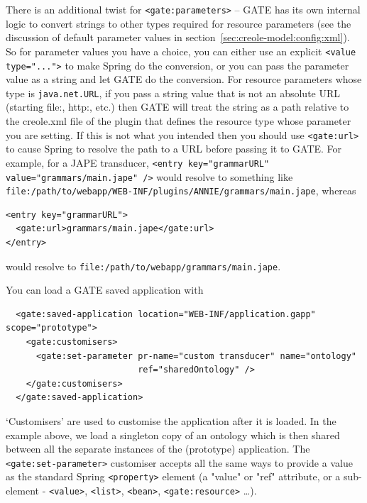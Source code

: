 There is an additional twist for \verb|<gate:parameters>| -- GATE has its own
internal logic to convert strings to other types required for resource
parameters (see the discussion of default parameter values in
section~\ref{sec:creole-model:config:xml}).  So for parameter values you have a
choice, you can either use an explicit \verb|<value type="...">| to make Spring
do the conversion, or you can pass the parameter value as a string and let GATE
do the conversion.  For resource parameters whose type is \verb|java.net.URL|,
if you pass a string value that is not an absolute URL (starting file:, http:,
etc.) then GATE will treat the string as a path relative to the creole.xml file
of the plugin that defines the resource type whose parameter you are setting.
If this is not what you intended then you should use \verb|<gate:url>| to cause
Spring to resolve the path to a URL before passing it to GATE.  For example,
for a JAPE transducer,
\verb|<entry key="grammarURL" value="grammars/main.jape" />| would resolve to
something like
\verb|file:/path/to/webapp/WEB-INF/plugins/ANNIE/grammars/main.jape|, whereas
%
\begin{small}\begin{verbatim}
<entry key="grammarURL">
  <gate:url>grammars/main.jape</gate:url>
</entry>
\end{verbatim}\end{small}
would resolve to \verb|file:/path/to/webapp/grammars/main.jape|.

You can load a GATE saved application with
\begin{small}
\begin{verbatim}
  <gate:saved-application location="WEB-INF/application.gapp" scope="prototype">
    <gate:customisers>
      <gate:set-parameter pr-name="custom transducer" name="ontology"
                          ref="sharedOntology" />
    </gate:customisers>
  </gate:saved-application>
\end{verbatim}\end{small}

`Customisers' are used to customise the application after it is loaded.  In the
example above, we load a singleton copy of an ontology which is then shared
between all the separate instances of the (prototype) application.  The
\verb|<gate:set-parameter>| customiser accepts all the same ways to provide a
value as the standard Spring \verb|<property>| element (a "value" or "ref"
attribute, or a sub-element - \verb|<value>|, \verb|<list>|, \verb|<bean>|,
\verb|<gate:resource>| \ldots).

